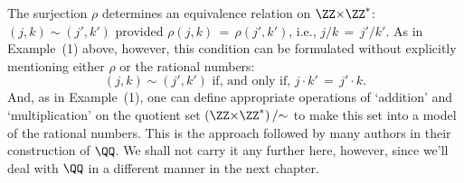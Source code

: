 {{       The surjection ${\rho}$ determines an equivalence relation on ${\ZZ}{\times}{\ZZ}^{*}$:
    $(j,k) {\sim} (j',k')$ provided ${\rho}(j,k) \,=\, {\rho}(j',k')$, i.e., $j/k \,=\, j'/k'$.
    As in  Example~(1) above, however, this condition can be formulated without explicitly mentioning either ${\rho}$ or the rational numbers:
        \begin{displaymath}
        (j,k) {\sim} (j',k') \mbox{ if, and only if, } j{\cdot}k' \,=\, j'{\cdot}k.
        \end{displaymath}
    And, as in Example~(1), one can define appropriate operations of `addition' and `multiplication' on the quotient set $\left({\ZZ}{\times}{\ZZ}^{*}\right)/{\sim}$ to make this set into a model of the rational numbers.
    This is the approach followed by many authors in their construction of ${\QQ}$.
    We shall not carry it  any further here, however, since we'll deal with ${\QQ}$ in a different manner in the next chapter.
}%
}%

